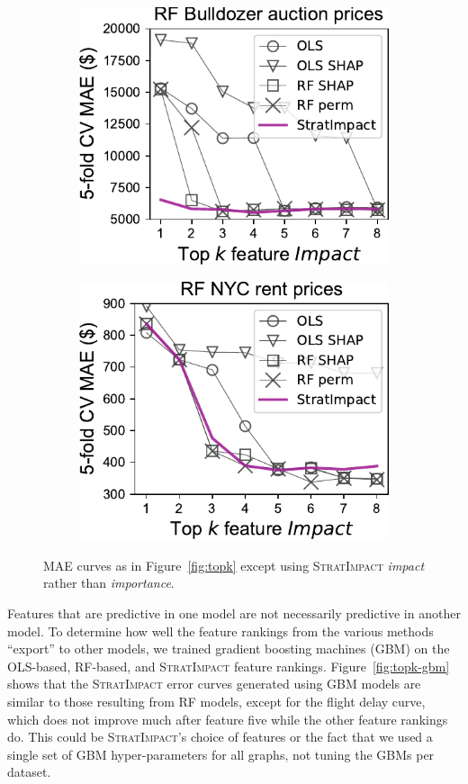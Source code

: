 \documentclass[11pt]{article}
\newcommand{\figref}[1]{Figure~\ref{#1}}
\newcommand{\simp}{\fontfamily{cmr}\textsc{\small StratImpact}}
\begin{document}
\begin{figure}
\begin{subfigure}{.245\textwidth}
\includegraphics[scale=0.45]{images/bulldozer-topk-RF-Impact.pdf}
\subcaption{}
\end{subfigure}%
\hfill
\begin{subfigure}{.245\textwidth}
    \centering
\includegraphics[scale=0.45]{images/rent-topk-RF-Impact.pdf}
\subcaption{}
\end{subfigure}
\caption[short]{\small MAE curves as in \figref{fig:topk} except using \simp{} {\em impact} rather than {\em importance}.}
\label{fig:topk-impact}
\end{figure}

Features that are predictive in one model are not necessarily predictive in another model.  To determine how well the feature rankings from the various methods ``export'' to other models, we trained gradient boosting machines (GBM) on the OLS-based, RF-based, and \simp{} feature rankings. \figref{fig:topk-gbm} shows that the \simp{} error curves generated using GBM models are similar to those resulting from RF models, except for the flight delay curve, which does not improve much after feature five while the other feature rankings do.  This could be \simp's choice of features or the fact that we used a single set of GBM hyper-parameters for all graphs, not tuning the GBMs per dataset. 
\end{document}

